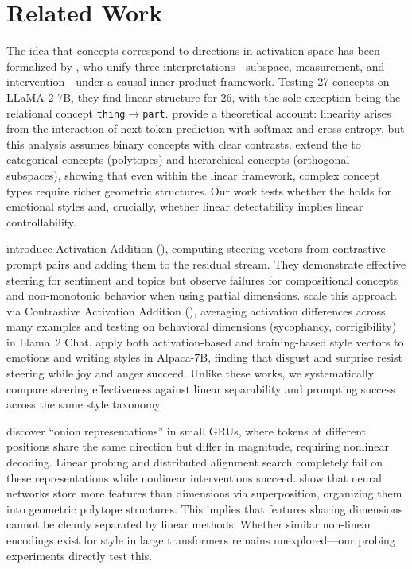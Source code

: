 \section{Related Work}
\label{sec:related}

The idea that concepts correspond to directions in activation space has been formalized by \citet{park2023linear}, who unify three interpretations---subspace, measurement, and intervention---under a causal inner product framework. Testing 27 concepts on LLaMA-2-7B, they find linear structure for 26, with the sole exception being the relational concept \texttt{thing$\rightarrow$part}. \citet{jiang2024origins} provide a theoretical account: linearity arises from the interaction of next-token prediction with softmax and cross-entropy, but this analysis assumes binary concepts with clear contrasts. \citet{park2024geometry} extend the \lrh to categorical concepts (polytopes) and hierarchical concepts (orthogonal subspaces), showing that even within the linear framework, complex concept types require richer geometric structures. Our work tests whether the \lrh holds for emotional styles and, crucially, whether linear detectability implies linear controllability.

\citet{turner2023steering} introduce Activation Addition (\actadd), computing steering vectors from contrastive prompt pairs and adding them to the residual stream. They demonstrate effective steering for sentiment and topics but observe failures for compositional concepts and non-monotonic behavior when using partial dimensions. \citet{rimsky2024steering} scale this approach via Contrastive Activation Addition (\caa), averaging activation differences across many examples and testing on behavioral dimensions (sycophancy, corrigibility) in Llama~2 Chat. \citet{konen2024style} apply both activation-based and training-based style vectors to emotions and writing styles in Alpaca-7B, finding that disgust and surprise resist steering while joy and anger succeed. Unlike these works, we systematically compare steering effectiveness against linear separability and prompting success across the same style taxonomy.

\citet{csordas2024nonlinear} discover ``onion representations'' in small GRUs, where tokens at different positions share the same direction but differ in magnitude, requiring nonlinear decoding. Linear probing and distributed alignment search completely fail on these representations while nonlinear interventions succeed. \citet{elhage2022superposition} show that neural networks store more features than dimensions via superposition, organizing them into geometric polytope structures. This implies that features sharing dimensions cannot be cleanly separated by linear methods. Whether similar non-linear encodings exist for style in large transformers remains unexplored---our probing experiments directly test this.

